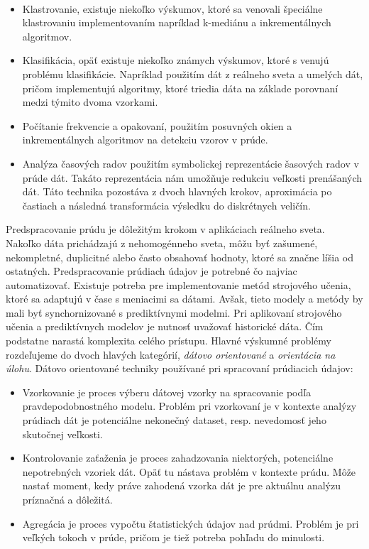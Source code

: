 \documentclass[11pt]{article}
\begin{document}
\\
\begin{itemize}
	\item Klastrovanie, existuje niekoľko výskumov, ktoré sa venovali špeciálne klastrovaniu implementovaním napríklad k-mediánu a inkrementálnych algoritmov.
	\item Klasifikácia, opäť existuje niekoľko známych výskumov, ktoré s venujú problému klasifikácie. Napríklad použitím dát z reálneho sveta a umelých dát, pričom implementujú algoritmy, ktoré triedia dáta na základe porovnaní medzi týmito dvoma vzorkami.
	\item Počítanie frekvencie a opakovaní, použitím posuvných okien a inkrementálnych algoritmov na detekciu vzorov v prúde.
	\item Analýza časových radov použitím symbolickej reprezentácie šasových radov v prúde dát. Takáto reprezentácia nám umožňuje redukciu veľkosti prenášaných dát. Táto technika pozostáva z dvoch hlavných krokov, aproximácia po častiach a následná transformácia výsledku do diskrétnych veličín.
\end{itemize}
Predspracovanie prúdu je dôležitým krokom v aplikáciach reálneho sveta. Nakoľko dáta prichádzajú z nehomogénneho sveta, môžu byť zašumené, nekompletné, duplicitné alebo často obsahovať hodnoty, ktoré sa značne líšia od ostatných. Predspracovanie prúdiach údajov je potrebné čo najviac automatizovať. Existuje potreba pre implementovanie metód  strojového učenia, ktoré sa adaptujú v čase s meniacimi sa dátami. Avšak, tieto modely a metódy by mali byť synchornizované s prediktívnymi modelmi. Pri aplikovaní strojového učenia a prediktívnych modelov je nutnosť uvažovať historické dáta. Čím podstatne narastá komplexita celého prístupu.
Hlavné výskumné problémy rozdeľujeme do dvoch hlavých kategórií, \textit{dátovo orientované} a \textit{orientácia na úlohu}. 
Dátovo orientované techniky používané pri spracovaní prúdiacich údajov:
\begin{itemize}
	\item Vzorkovanie je proces výberu dátovej vzorky na spracovanie podľa pravdepodobnostného modelu. Problém pri vzorkovaní je v kontexte analýzy prúdiach dát je potenciálne nekonečný dataset, resp. nevedomosť jeho skutočnej veľkosti.
	\item Kontrolovanie zaťaženia je proces zahadzovania niektorých, potenciálne nepotrebných vzoriek dát. Opäť tu nástava problém v kontexte prúdu. Môže nastať moment, kedy práve zahodená vzorka dát je pre aktuálnu analýzu príznačná a dôležitá.
	\item Agregácia je proces vypočtu štatistických údajov nad prúdmi. Problém je pri veľkých tokoch v prúde, pričom je tiež potreba pohľadu do minulosti.
\end{itemize}
\end{document}
